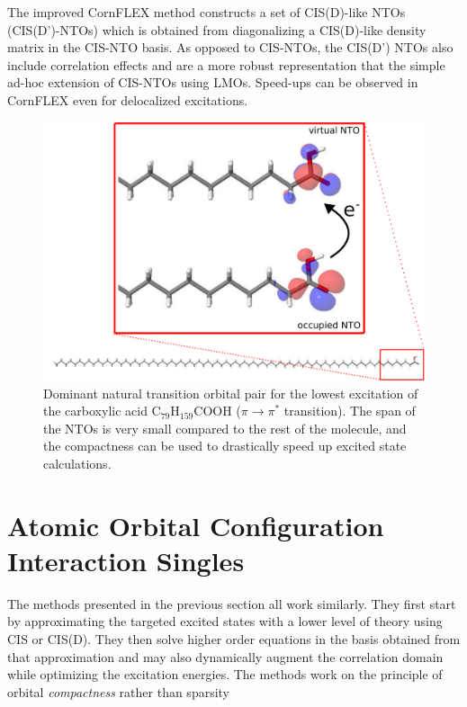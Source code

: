 The improved CornFLEX method constructs a set of CIS(D)-like NTOs (CIS(D')-NTOs) which is obtained from diagonalizing a CIS(D)-like density matrix in the CIS-NTO basis. As opposed to CIS-NTOs, the CIS(D') NTOs also include correlation effects and are a more robust representation that the simple ad-hoc extension of CIS-NTOs using LMOs. Speed-ups can be observed in CornFLEX even for delocalized excitations.


\begin{figure}
\centering
\includegraphics[scale=0.6]{Pics/NTOACID}
\caption[Dominant natural transition orbital pair for the lowest excitation of the carboxylic acid C$_{79}$H$_{159}$COOH.]{Dominant natural transition orbital pair for the lowest excitation of the carboxylic acid C$_{79}$H$_{159}$COOH ($\pi \rightarrow \pi^*$ transition). The span of the NTOs is very small compared to the rest of the molecule, and the compactness can be used to drastically speed up excited state calculations.}
\label{fig:NTO}
\end{figure}

\section{Atomic Orbital Configuration Interaction Singles}


The methods presented in the previous section all work similarly. They first start by approximating the targeted excited states with a lower level of theory using CIS or CIS(D). They then solve higher order equations in the basis obtained from that approximation and may also dynamically augment the correlation domain while optimizing the excitation energies. The methods work on the principle of orbital \emph{compactness} rather than sparsity

